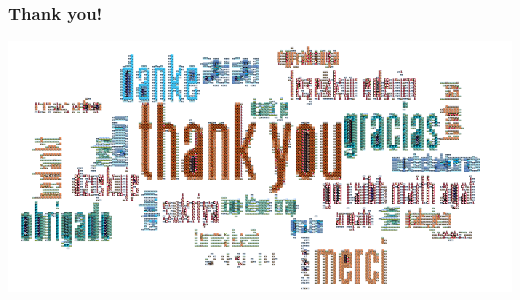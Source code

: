 \documentclass[11pt]{beamer}
\begin{document}
\begin{frame}
\frametitle{Thank you!}

\begin{center}\includegraphics[width=\textwidth]{thank-you5.png}\end{center}

\end{frame}
\end{document}
